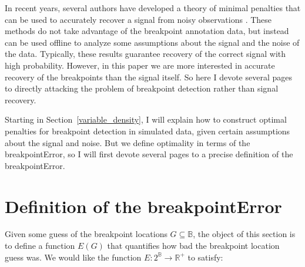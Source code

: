 \documentclass{jsfds} %
\newcommand{\RR}{\mathbb{R}}
\begin{document}
In recent years, several authors have developed a theory of minimal
penalties that can be used to accurately recover a signal from noisy
observations \citep{calibration,lebarbier}. These methods do not take
advantage of the breakpoint annotation data, but instead can be used
offline to analyze some assumptions about the signal and the noise of
the data. Typically, these results guarantee recovery of the correct
signal with high probability. However, in this paper we are more
interested in accurate recovery of the breakpoints than the signal
itself.
So here I devote several
pages to directly attacking the problem of breakpoint detection rather
than signal recovery.



Starting in Section~\ref{variable_density}, I will explain how to
construct optimal penalties for breakpoint detection in simulated
data, given certain assumptions about the signal and noise. But we
define optimality in terms of the breakpointError, so I will first
devote several pages to a precise definition of the breakpointError.

\section{Definition of the breakpointError}

Given some guess of the breakpoint locations $G\subseteq\mathbb B$,
the object of this section is to define a function ${E }(G)$
that quantifies how bad the breakpoint location guess was. We would
like the function ${E }: 2^{\mathbb B}\rightarrow \RR^+$ to
satisfy:
\end{document}
